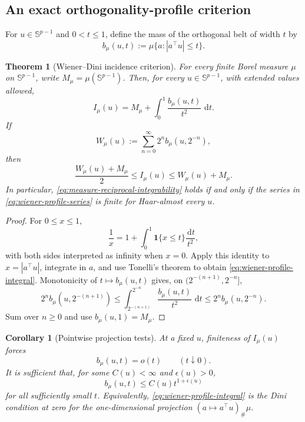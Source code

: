 \documentclass[11pt]{article}
\numberwithin{equation}{section}
\theoremstyle{thmstyleone}%
\newtheorem{theorem}{Theorem}[section]
\newtheorem{corollary}[corollary]{Corollary}
\theoremstyle{thmstyletwo}%
\let\cref\autoref
\newcommand{\sphere}{\mathbb S}
\newcommand{\dd}{\,\mathrm d}
\begin{document}
\subsection{An exact orthogonality-profile criterion}

For \(u\in\sphere^{p-1}\) and \(0<t\leq1\), define the mass of the
orthogonal belt of width \(t\) by
\begin{equation}
  b_\mu(u,t)
  :=
  \mu\{a:|a^\top u|\leq t\}.
  \label{eq:orthogonality-profile}
\end{equation}

\begin{theorem}[Wiener--Dini incidence criterion]
\label{thm:wiener-incidence}
For every finite Borel measure \(\mu\) on \(\sphere^{p-1}\), write
\(M_\mu=\mu(\sphere^{p-1})\).  Then, for every
\(u\in\sphere^{p-1}\), with extended values allowed,
\begin{equation}
  I_\mu(u)
  =
  M_\mu+\int_0^1\frac{b_\mu(u,t)}{t^2}\,\dd t.
  \label{eq:wiener-profile-integral}
\end{equation}
If
\begin{equation}
  W_\mu(u)
  :=
  \sum_{n=0}^\infty
  2^n b_\mu(u,2^{-n}),
  \label{eq:wiener-profile-series}
\end{equation}
then
\begin{equation}
  \frac{W_\mu(u)+M_\mu}{2}
  \leq I_\mu(u)\leq W_\mu(u)+M_\mu.
  \label{eq:wiener-profile-comparison}
\end{equation}
In particular, \cref{eq:measure-reciprocal-integrability} holds if and only
if the series in \cref{eq:wiener-profile-series} is finite for
Haar-almost every \(u\).
\end{theorem}

\begin{proof}
For \(0\leq x\leq1\),
\[
  \frac1x
  =
  1+\int_0^1
  \boldsymbol 1\{x\leq t\}\frac{\dd t}{t^2},
\]
with both sides interpreted as infinity when \(x=0\).  Apply this identity
to \(x=|a^\top u|\), integrate in \(a\), and use Tonelli's theorem to
obtain \cref{eq:wiener-profile-integral}.  Monotonicity of
\(t\mapsto b_\mu(u,t)\) gives, on
\((2^{-(n+1)},2^{-n}]\),
\[
  2^n b_\mu(u,2^{-(n+1)})
  \leq
  \int_{2^{-(n+1)}}^{2^{-n}}
  \frac{b_\mu(u,t)}{t^2}\,\dd t
  \leq
  2^n b_\mu(u,2^{-n}).
\]
Sum over \(n\geq0\) and use \(b_\mu(u,1)=M_\mu\).
\end{proof}

\begin{corollary}[Pointwise projection tests]
\label{cor:projection-tests}
At a fixed \(u\), finiteness of \(I_\mu(u)\) forces
\[
  b_\mu(u,t)=o(t)\qquad(t\downarrow0).
\]
It is sufficient that, for some \(C(u)<\infty\) and \(\epsilon(u)>0\),
\[
  b_\mu(u,t)\leq C(u)t^{1+\epsilon(u)}
\]
for all sufficiently small \(t\).  Equivalently,
\cref{eq:wiener-profile-integral} is the Dini condition at zero for the
one-dimensional projection
\((a\mapsto a^\top u)_\#\mu\).
\end{corollary}
\end{document}
